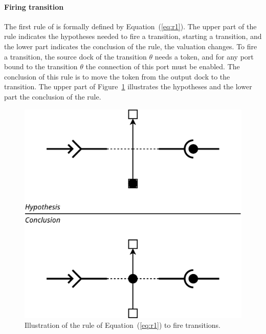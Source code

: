 \paragraph{Firing transition}{

The first rule of \mad is formally defined by
Equation~(\ref{eq:r1}). The upper part of the rule indicates the
hypotheses needed to fire a transition, \ie starting a transition,
and the lower part indicates the conclusion of the rule, \ie the valuation
changes. To fire a transition, the source dock of the transition
$\theta$ needs a token, and for any port bound to the transition
$\theta$ the connection of this port must be enabled. The conclusion of
this rule is to move the token from the output dock to the
transition. The upper part of Figure~\ref{fig:r1} illustrates the
hypotheses and the lower part the conclusion of the rule.

\begin{figure}[t]
\begin{center}
  \includegraphics[width=0.55\columnwidth]{./images/firing.pdf}
\end{center}
\caption{Illustration of the rule of Equation~(\ref{eq:r1}) to fire transitions.}
\label{fig:r1}
\end{figure}

}

